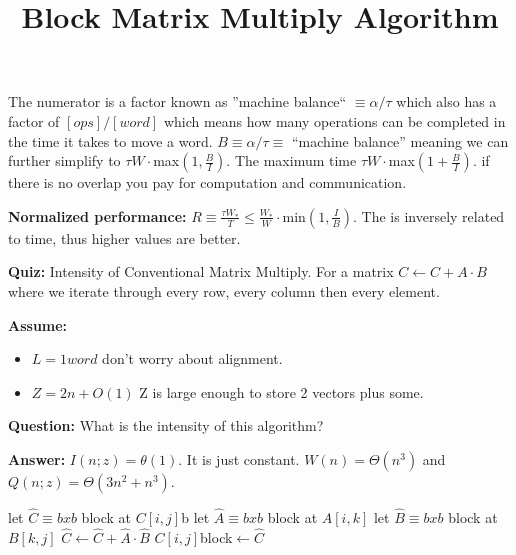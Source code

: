 \documentclass[../main.tex]{subfiles}
\begin{document}
	The numerator is a factor known as ''machine balance`` $\equiv \alpha / \tau$ which also has a factor of $[ops]/[word]$ which means how many operations can be completed in the time it takes to move a word. $B \equiv \alpha / \tau \equiv $ ``machine balance'' meaning we can further simplify to $\tau W \cdot$max$(1,\frac{B}{I})$. The maximum time  $\tau W \cdot$max$(1 + \frac{B}{I})$. if there is no overlap you pay for computation and communication.
	
	\textbf{Normalized performance: } $R \equiv \frac{\tau W_*}{T} \leq \frac{W_*}{W} \cdot$min$(1,\frac{I}{B})$. The is inversely related to time, thus higher values are better.
	\begin{mdframed}[style=Quiz]
		\textbf{Quiz: } Intensity of Conventional Matrix Multiply. For a matrix $C \gets C + A \cdot B$ where we iterate through every row, every column then every element.
		
		\noindent
		\textbf{Assume:}
		\begin{itemize}
			\item $L = 1 word$ don't worry about alignment.
			\item $Z = 2n + O(1)$ Z is large enough to store 2 vectors plus some.
		\end{itemize}
		
		\noindent
		\textbf{Question:} What is the intensity of this algorithm?
		
		\noindent
		\textbf{Answer:} $I(n;z) = \theta(1)$. It is just constant. $W(n) = \Theta(n^3)$ and $Q(n;z) = \Theta(3n^2 + n^3)$.
	\end{mdframed}
	\clearpage
	\begin{algorithm}
		\title{Block Matrix Multiply Algorithm}
		\begin{algorithmic}
			\State let $\hat{C} \equiv bxb$ block at $C[i,j]$b
			\State let $\hat{A} \equiv bxb$ block at $A[i,k]$
			\State let $\hat{B} \equiv bxb$ block at $B[k,j]$
			\State $\hat{C} \gets \hat{C} + \hat{A} \cdot \hat{B}$
			\EndFor
			\State $C[i,j]$block$\gets\hat{C}$
			\EndFor
			\EndFor
		\end{algorithmic}
	\end{algorithm}
\end{document}
